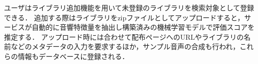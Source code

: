 ユーザはライブラリ追加機能を用いて未登録のライブラリを検索対象として登録できる．
追加する際はライブラリをzipファイルとしてアップロードすると，サービスが自動的に音響特徴量を抽出し構築済みの機械学習モデルで評価スコアを推定する．
アップロード時には合わせて配布ページへのURLやライブラリの名前などのメタデータの入力を要求するほか，サンプル音声の合成も行われ，これらの情報もデータベースに登録される．




